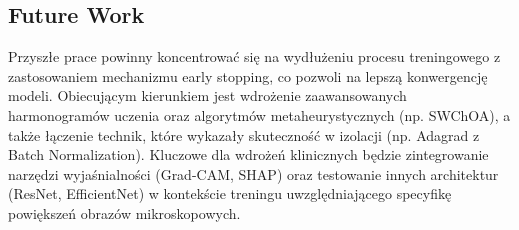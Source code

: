 \subsection{Future Work}
Przyszłe prace powinny koncentrować się na wydłużeniu procesu treningowego z zastosowaniem mechanizmu early stopping, co pozwoli na lepszą konwergencję modeli. Obiecującym kierunkiem jest wdrożenie zaawansowanych harmonogramów uczenia oraz algorytmów metaheurystycznych (np. SWChOA), a także łączenie technik, które wykazały skuteczność w izolacji (np. Adagrad z Batch Normalization). Kluczowe dla wdrożeń klinicznych będzie zintegrowanie narzędzi wyjaśnialności (Grad-CAM, SHAP) oraz testowanie innych architektur (ResNet, EfficientNet) w kontekście treningu uwzględniającego specyfikę powiększeń obrazów mikroskopowych.

